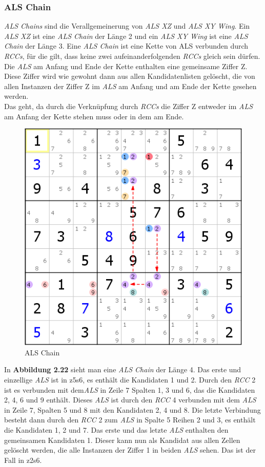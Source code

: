 \newpage
\subsubsection{ALS Chain}
\textit{ALS Chains} sind die Verallgemeinerung von \textit{ALS XZ} und \textit{ALS XY Wing}. Ein \textit{ALS XZ} ist eine \textit{ALS Chain} der Länge 2 und ein \textit{ALS XY Wing} ist eine \textit{ALS Chain} der Länge 3. Eine \textit{ALS Chain} ist eine Kette von {ALS} verbunden durch \textit{RCCs}, für die gilt, dass keine zwei aufeinanderfolgenden \textit{RCCs} gleich sein dürfen. Die \textit{ALS} am Anfang und Ende der Kette enthalten eine gemeinsame Ziffer Z. Diese Ziffer wird wie gewohnt dann aus allen Kandidatenlisten gelöscht, die von allen Instanzen der Ziffer Z im \textit{ALS} am Anfang und am Ende der Kette gesehen werden.\\
Das geht, da durch die Verknüpfung durch \textit{RCCs} die Ziffer Z entweder im \textit{ALS} am Anfang der Kette stehen muss oder in dem am Ende.

\begin{figure}[h]
\begin{center}
\includegraphics{./img/ALS_Chain.png}
\caption{ALS Chain}
\end{center}
\end{figure}

In \textbf{Abbildung 2.22} sieht man eine \textit{ALS Chain} der Länge 4. Das erste und einzellige \textit{ALS} ist in z5s6, es enthält die Kandidaten 1 und 2. Durch den \textit{RCC} 2 ist es verbunden mit dem\textit{ALS} in Zeile 7 Spalten 1, 3 und 6, das die Kandidaten 2, 4, 6 und 9 enthält. Dieses \textit{ALS} ist durch den \textit{RCC} 4 verbunden mit dem \textit{ALS} in Zeile 7, Spalten 5 und 8 mit den Kandidaten 2, 4 und 8. Die letzte Verbindung besteht dann durch den \textit{RCC} 2 zum \textit{ALS} in Spalte 5 Reihen 2 und 3, es enthält die Kandidaten 1, 2 und 7. Das erste und das letzte \textit{ALS} enthalten den gemeinsamen Kandidaten 1. Dieser kann nun als Kandidat aus allen Zellen gelöscht werden, die alle Instanzen der Ziffer 1 in beiden \textit{ALS} sehen. Das ist der Fall in z2s6.